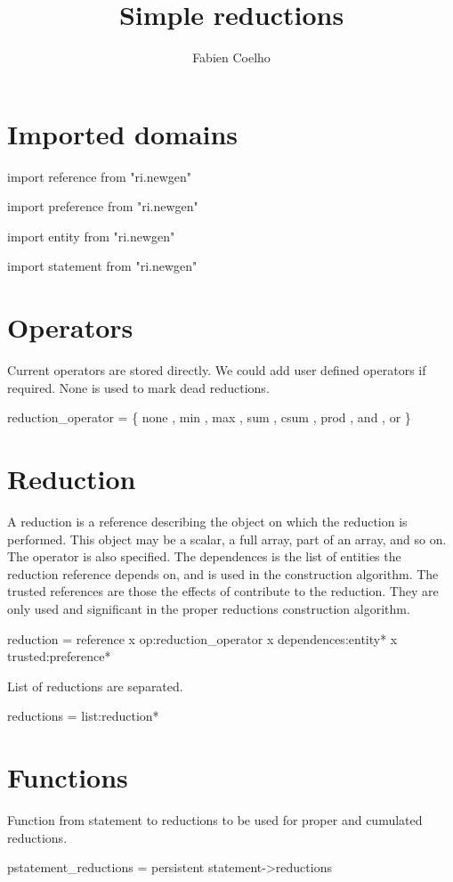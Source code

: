 \documentclass[a4paper]{article}
\title{Simple reductions}
\author{Fabien Coelho}
\newcommand{\domain}[1]{\par{#1}}
\begin{document}
\maketitle

\section{Imported domains}
\label{sec:import}

\domain{import reference from "ri.newgen"}
\domain{import preference from "ri.newgen"}
\domain{import entity from "ri.newgen"}
\domain{import statement from "ri.newgen"}

\section{Operators}
\label{sec:operators}

Current operators are stored directly.
We could add user defined operators if required.
None is used to mark dead reductions. 

\domain{reduction\_operator = \{ none , min , max , sum , csum , prod , and , or \}}
{}

\section{Reduction}
\label{sec:reduction}

A reduction is a reference describing the object on which the reduction is
performed. This object may be a scalar, a full array, part of an array,
and so on. The operator is also specified. The dependences is the list of
entities the reduction reference depends on, and is used in the
construction algorithm. The trusted references are those the effects of
contribute to the reduction. They are only used and significant in the
proper reductions construction algorithm.

\domain{reduction = reference x op:reduction\_operator x dependences:entity* x trusted:preference*}
{}

List of reductions are separated.

\domain{reductions = list:reduction*}
{}


\section{Functions}
\label{sec:functions}

Function from statement to reductions to be used for proper and cumulated
reductions. 

\domain{pstatement\_reductions = persistent statement->reductions}
{}
\end{document}
